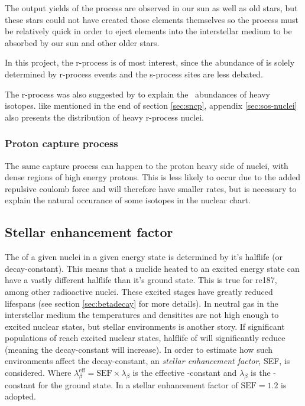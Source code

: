 The output yields of the process are observed in our sun as well as old stars, but these stars could not have created those elements themselves so the process must be relatively quick in order to eject elements into the interstellar medium to be absorbed by our sun and other older stars.

In this project, the r-process is of most interest, since the abundance of  is solely determined by r-process events and the s-process sites are less debated.

The r-process was also suggested by  to explain the \sos\ abundances of heavy isotopes.
like mentioned in the end of section \ref{sec:sncp}, appendix \ref{sec:sos-nuclei} also presents the distribution of heavy r-process nuclei.

\subsubsection{Proton capture process}
The same capture process can happen to the proton heavy side of nuclei, with dense regions of high energy protons. This is less likely to occur due to the added repulsive coulomb force and will therefore have smaller rates, but is necessary to explain the natural occurance of some isotopes in the nuclear chart.

\subsection{Stellar enhancement factor} \label{sec:sef}
The \betadecay of a given nuclei in a given energy state is determined by it's halflife (or decay-constant).
This means that a nuclide heated to an excited energy state can have a vastly different halflife than  it's ground state.
This is true for re{187}, among other radioactive nuclei.
These excited stages have greatly reduced lifespans (see section \ref{sec:betadecay} for more details).
In neutral gas in the interstellar medium the temperatures and densitites are not high enough to excited nuclear states, but stellar environments is another story.
If significant populations of  reach excited nuclear states, halflife of  will significantly reduce (meaning the decay-constant will increase).
In order to estimate how such environments affect the decay-constant, an \textit{stellar enhancement factor}, SEF, is considered. Where $\lambda_{\scriptscriptstyle \beta}^{\scriptscriptstyle \textrm{eff}} = \textrm{SEF}\times\lambda_{\scriptscriptstyle \beta}$ is the effective \betadecay-constant and $\lambda_{\scriptscriptstyle \beta}$ is the \betadecay-constant for the ground state.
In  a stellar enhancement factor of $\textrm{SEF}=1.2$ is adopted.
\FloatBarrier
